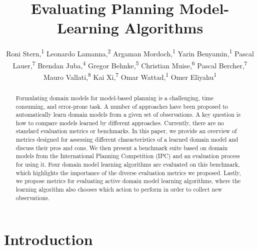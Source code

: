 \documentclass[letterpaper]{article} %
\title{Evaluating Planning Model-Learning Algorithms}
\author{
    Roni Stern,\textsuperscript{\rm 1}
    Leonardo Lamanna,\textsuperscript{\rm 2}
    Argaman Mordoch,\textsuperscript{\rm 1}
    Yarin Benyamin,\textsuperscript{\rm 1}
    Pascal Lauer,\textsuperscript{\rm 7}
    Brendan Juba,\textsuperscript{\rm 4}
    Gregor Behnke,\textsuperscript{\rm 5}
    Christian Muise,\textsuperscript{\rm 6}
    Pascal Bercher,\textsuperscript{\rm 7}
    Mauro Vallati,\textsuperscript{\rm 8}
    Kai Xi,\textsuperscript{\rm 7}
    Omar Wattad,\textsuperscript{\rm 1}
    Omer Eliyahu\textsuperscript{\rm 1}
}
\newif\ifaddcomments
\newcommand{\roni}[1]{\ifaddcomments{\textcolor{red}{[Roni: #1]}}\fi}
\begin{document}
\maketitle

\begin{abstract}
Formulating domain models for model-based planning is a challenging, time consuming, and error-prone task. 
A number of approaches have been proposed to automatically learn domain models from a given set of observations. 
A key question is how to compare models learned by different approaches. 
Currently, there are no standard evaluation metrics or benchmarks. 
In this paper, we provide an overview of metrics designed for assessing different characteristics of a learned domain model
and discuss their pros and cons. 
We then present a benchmark suite based on domain models from the International Planning Competition (IPC) and an evaluation process for using it.
Four domain model learning algorithms are evaluated on this benchmark, which highlights the importance of the diverse evaluation metrics we proposed. 
Lastly, we propose metrics for evaluating active domain model learning algorithms, where the learning algorithm also chooses which action to perform in order to collect new observations. 
\roni{Some changes in the abstract}
\end{abstract}

%



\section{Introduction}
\end{document}
